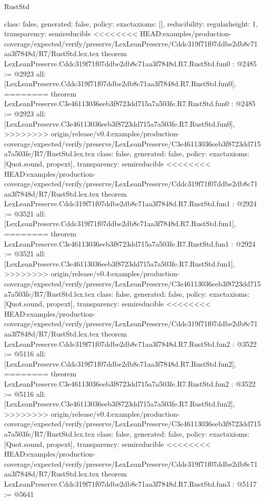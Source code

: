 \begin{lexlean}{RustStd}
\begin{coremodule}
{\begin{coremodule}
{{{  class: false,
  generated: false,
  policy: exact{axioms: []},
  reducibility: regular{height: 1},
  transparency: semireducible
}
<<<<<<<< HEAD:examples/production-coverage/expected/verify/preserve/LexLeanPreserve/Cddc319f71f07ddbe2db8c71aa3f7848d/R7/RustStd.lex.tex
theorem LexLeanPreserve.Cddc319f71f07ddbe2db8c71aa3f7848d.R7.RustStd.fun0 : @2485 := @2923 {
  all: [LexLeanPreserve.Cddc319f71f07ddbe2db8c71aa3f7848d.R7.RustStd.fun0],
========
theorem LexLeanPreserve.C3e46113036eeb3f8723dd715a7a503fe.R7.RustStd.fun0 : @2485 := @2923 {
  all: [LexLeanPreserve.C3e46113036eeb3f8723dd715a7a503fe.R7.RustStd.fun0],
>>>>>>>> origin/release/v0.4:examples/production-coverage/expected/verify/preserve/LexLeanPreserve/C3e46113036eeb3f8723dd715a7a503fe/R7/RustStd.lex.tex
  class: false,
  generated: false,
  policy: exact{axioms: [Quot.sound, propext]},
  transparency: semireducible
}
<<<<<<<< HEAD:examples/production-coverage/expected/verify/preserve/LexLeanPreserve/Cddc319f71f07ddbe2db8c71aa3f7848d/R7/RustStd.lex.tex
theorem LexLeanPreserve.Cddc319f71f07ddbe2db8c71aa3f7848d.R7.RustStd.fun1 : @2924 := @3521 {
  all: [LexLeanPreserve.Cddc319f71f07ddbe2db8c71aa3f7848d.R7.RustStd.fun1],
========
theorem LexLeanPreserve.C3e46113036eeb3f8723dd715a7a503fe.R7.RustStd.fun1 : @2924 := @3521 {
  all: [LexLeanPreserve.C3e46113036eeb3f8723dd715a7a503fe.R7.RustStd.fun1],
>>>>>>>> origin/release/v0.4:examples/production-coverage/expected/verify/preserve/LexLeanPreserve/C3e46113036eeb3f8723dd715a7a503fe/R7/RustStd.lex.tex
  class: false,
  generated: false,
  policy: exact{axioms: [Quot.sound, propext]},
  transparency: semireducible
}
<<<<<<<< HEAD:examples/production-coverage/expected/verify/preserve/LexLeanPreserve/Cddc319f71f07ddbe2db8c71aa3f7848d/R7/RustStd.lex.tex
theorem LexLeanPreserve.Cddc319f71f07ddbe2db8c71aa3f7848d.R7.RustStd.fun2 : @3522 := @5116 {
  all: [LexLeanPreserve.Cddc319f71f07ddbe2db8c71aa3f7848d.R7.RustStd.fun2],
========
theorem LexLeanPreserve.C3e46113036eeb3f8723dd715a7a503fe.R7.RustStd.fun2 : @3522 := @5116 {
  all: [LexLeanPreserve.C3e46113036eeb3f8723dd715a7a503fe.R7.RustStd.fun2],
>>>>>>>> origin/release/v0.4:examples/production-coverage/expected/verify/preserve/LexLeanPreserve/C3e46113036eeb3f8723dd715a7a503fe/R7/RustStd.lex.tex
  class: false,
  generated: false,
  policy: exact{axioms: [Quot.sound, propext]},
  transparency: semireducible
}
<<<<<<<< HEAD:examples/production-coverage/expected/verify/preserve/LexLeanPreserve/Cddc319f71f07ddbe2db8c71aa3f7848d/R7/RustStd.lex.tex
theorem LexLeanPreserve.Cddc319f71f07ddbe2db8c71aa3f7848d.R7.RustStd.fun3 : @5117 := @5641 {
}}}}}}
\end{coremodule}}
\end{coremodule}
\end{lexlean}
